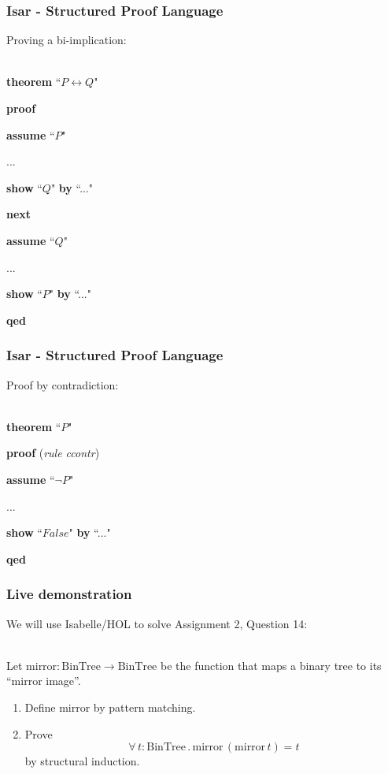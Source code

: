 \documentclass{beamer}
\renewcommand{\indent}{\hspace*{1em}}
\begin{document}
  \begin{frame}
	\frametitle{Isar - Structured Proof Language}
	Proving a bi-implication:\\~\
	
	\textbf{theorem} ``$P \leftrightarrow Q$"
	
	\textbf{proof}
	
	\indent \textbf{assume} ``$P$"
	
	\indent ...
	
	\indent \textbf{show} ``$Q$" \textbf{by} ``..."
	
	\textbf{next}
	
	\indent \textbf{assume} ``$Q$"
	
	\indent ...
	
	\indent \textbf{show} ``$P$" \textbf{by} ``..."
	
	\textbf{qed}
  \end{frame}

  \begin{frame}
	\frametitle{Isar - Structured Proof Language}
	Proof by contradiction:\\~\
	
	\textbf{theorem} ``$P$"
	
	\textbf{proof} (\textit{rule ccontr})
	
	\indent \textbf{assume} ``$\lnot P$"
	
	\indent ...
	
	\indent \textbf{show} ``$False$" \textbf{by} ``..."
	
	\textbf{qed}
  \end{frame}

  \begin{frame}
    \frametitle{Live demonstration}
    We will use Isabelle/HOL to solve Assignment 2, Question 14:\\~\

    Let $\textrm{mirror} : \textrm{BinTree} \rightarrow
    \textrm{BinTree}$
    be the function that maps a binary tree to its ``mirror image''.

    \begin{enumerate}
      \item Define $\textrm{mirror}$ by pattern matching.

      \item Prove \[\forall\, t : \textrm{BinTree} \mathrel.
      \textrm{mirror}\,(\textrm{mirror}\,t) = t\] by structural
      induction.\\~\

    \end{enumerate}
  \end{frame}
\end{document}
